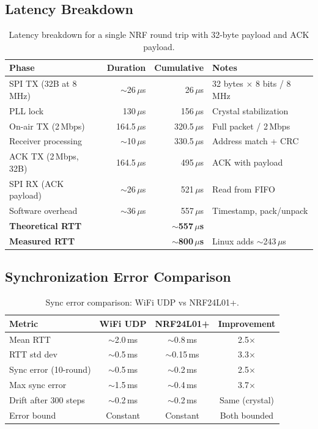 \documentclass[11pt,a4paper]{article}
\begin{document}
\subsection{Latency Breakdown}

\begin{table}[htbp]
\centering
\caption{Latency breakdown for a single NRF round trip with 32-byte payload and ACK payload.}
\begin{tabular}{l r r l}
\toprule
\textbf{Phase} & \textbf{Duration} & \textbf{Cumulative} & \textbf{Notes} \\
\midrule
SPI TX (32B at 8\,MHz) & ${\sim}$26\,$\mu$s & 26\,$\mu$s & 32 bytes $\times$ 8 bits / 8\,MHz \\
PLL lock & 130\,$\mu$s & 156\,$\mu$s & Crystal stabilization \\
On-air TX (2\,Mbps) & 164.5\,$\mu$s & 320.5\,$\mu$s & Full packet / 2\,Mbps \\
Receiver processing & ${\sim}$10\,$\mu$s & 330.5\,$\mu$s & Address match + CRC \\
ACK TX (2\,Mbps, 32B) & 164.5\,$\mu$s & 495\,$\mu$s & ACK with payload \\
SPI RX (ACK payload) & ${\sim}$26\,$\mu$s & 521\,$\mu$s & Read from FIFO \\
Software overhead & ${\sim}$36\,$\mu$s & 557\,$\mu$s & Timestamp, pack/unpack \\
\midrule
\textbf{Theoretical RTT} & & \textbf{${\sim}$557\,$\mu$s} & \\
\textbf{Measured RTT} & & \textbf{${\sim}$800\,$\mu$s} & Linux adds ${\sim}$243\,$\mu$s \\
\bottomrule
\end{tabular}
\label{tab:latency}
\end{table}

\subsection{Synchronization Error Comparison}

\begin{table}[htbp]
\centering
\caption{Sync error comparison: WiFi UDP vs NRF24L01+.}
\begin{tabular}{l c c c}
\toprule
\textbf{Metric} & \textbf{WiFi UDP} & \textbf{NRF24L01+} & \textbf{Improvement} \\
\midrule
Mean RTT & ${\sim}$2.0\,ms & ${\sim}$0.8\,ms & 2.5$\times$ \\
RTT std dev & ${\sim}$0.5\,ms & ${\sim}$0.15\,ms & 3.3$\times$ \\
Sync error (10-round) & ${\sim}$0.5\,ms & ${\sim}$0.2\,ms & 2.5$\times$ \\
Max sync error & ${\sim}$1.5\,ms & ${\sim}$0.4\,ms & 3.7$\times$ \\
Drift after 300 steps & ${\sim}$0.2\,ms & ${\sim}$0.2\,ms & Same (crystal) \\
Error bound & Constant & Constant & Both bounded \\
\bottomrule
\end{tabular}
\label{tab:sync-comparison}
\end{table}
\end{document}
